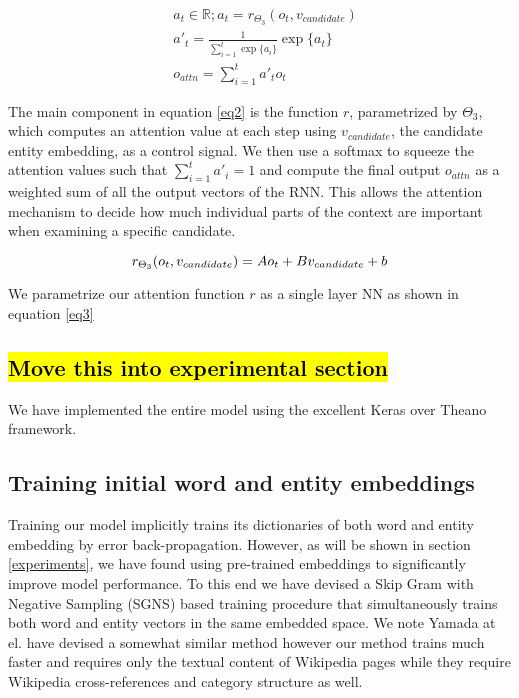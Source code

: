 \documentclass[11pt]{article}
\begin{document}
	\begin{equation}
	\label{eq2}
	\begin{aligned}
	& a_t \in \mathbb{R}; a_t=r_{\Theta_3}(o_t, v_{candidate}) \\
	& a'_t  = \frac{1}{\sum_{i=1}^{t} \exp\{a_i\}} \exp \{a_t\} \\
	& o_{attn}=\sum_{i=1}^{t} a'_t o_t
	\end{aligned}
	\end{equation}
	
	The main component in equation \ref{eq2} is the function $r$, parametrized by $\Theta_3$, which computes an attention value at each step using $v_{candidate}$, the candidate entity embedding, as a control signal. We then use a softmax to squeeze the attention values such that $\sum_{i=1}^{t} a'_i = 1$ and compute the final output $o_{attn}$ as a weighted sum of all the output vectors of the RNN. This allows the attention mechanism to decide how much individual parts of the context are important when examining a specific candidate.
	
	\begin{equation}
	\label{eq3}
	r_{\Theta_3}(o_t, v_{candidate}) = Ao_t + Bv_{candidate} + b \\
	\end{equation}
	
	We parametrize our attention function $r$ as a single layer NN as shown in equation \ref{eq3}
	
	\subsection{\hl{Move this into experimental section}}
	We have implemented the entire model using the excellent Keras \cite{chollet2015} over Theano \cite{team2016theano} framework.
	
	\subsection{Training initial word and entity embeddings}
	
	Training our model implicitly trains its dictionaries of both word and entity embedding by error back-propagation. However, as will be shown in section \ref{experiments}, we have found using pre-trained embeddings to significantly improve model performance. To this end we have devised a Skip Gram with Negative Sampling (SGNS) \cite{mikolov2013distributed} based training procedure that simultaneously trains both word and entity vectors in the same embedded space. We note Yamada at el. \cite{yamada2016joint} have devised a somewhat similar method however our method trains much faster and requires only the textual content of Wikipedia pages while they require Wikipedia cross-references and category structure as well.
	
\end{document}
